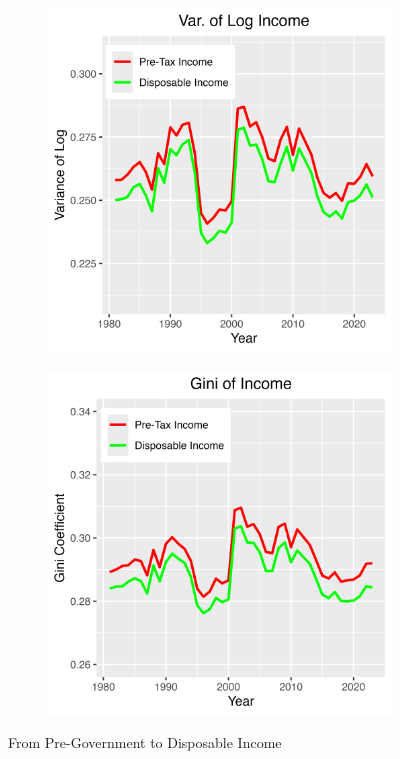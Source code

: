 \documentclass{article}
\begin{document}
\begin{figure}
\begin{subfigure}[t]{0.475\textwidth}
        \label{fig:Gov_Gini1}
    \end{subfigure}
    \begin{subfigure}[t]{0.475\textwidth}
        \centering
        \includegraphics[width=\textwidth]{figures/Fig_5/Fig_5c_Var_inc.png}
        \label{fig:Gov_Var2}
    \end{subfigure}
    \begin{subfigure}[t]{0.475\textwidth}
        \centering
        \includegraphics[width=\textwidth]{figures/Fig_5/Fig_5d_Gini_inc.png}
        \label{fig:Gov_Gini2}
    \end{subfigure}
    \caption{From Pre-Government to Disposable Income}
    \label{fig:Gov}
\end{figure}
\end{document}
